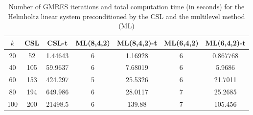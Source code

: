 \begin{table}[t]
\centering
\begin{tabular}{ccccccc}
\hline
$k$ & CSL & CSL-t & ML(8,4,2) & ML(8,4,2)-t& ML(6,4,2) & ML(6,4,2)-t \\ \hline
20  & 52  & 1.44643 & 6 & 1.16928 & 6 & 0.867768 \\
40  & 105 & 59.9637 & 6 & 7.68019 & 6 & 5.9686 \\
60  & 153 & 424.297 & 5 & 25.5326 & 6 & 21.7011 \\
80  & 194 & 649.986 & 6 & 28.0117 & 7 & 25.2685 \\
100 & 200 & 21498.5 & 6 & 139.88  & 7 & 105.456 \\
\hline
\end{tabular}
\caption{Number of GMRES iterations and total computation time (in seconds) for the Helmholtz linear system preconditioned by the  CSL and the multilevel method (ML)}
\label{table:mlgmres_csl_vs_adef_coarse_eps_20}
\end{table}
